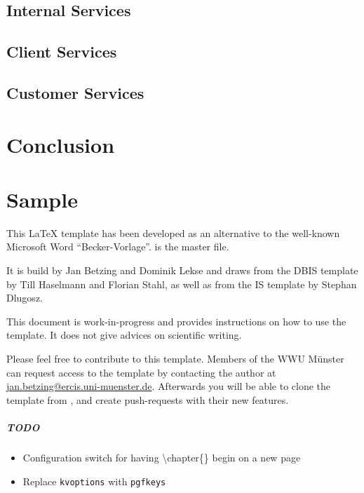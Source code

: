 	\section{Internal Services}
	\section{Client Services}
	\section{Customer Services}
\chapter{Conclusion}






\chapter{Sample}
This \LaTeX \- template has been developed as an alternative to the well-known Microsoft Word \enquote{Becker-Vorlage}.  is the master file.

It is build by  Jan Betzing and Dominik Lekse and draws from the DBIS template by Till Haselmann and Florian Stahl, as well as from the IS template by Stephan Dlugosz.

This document is work-in-progress and provides instructions on how to use the template. It does not give advices on scientific writing.

Please feel free to contribute to this template. Members of the WWU M\"{u}nster can request access to the template by contacting the author at \href{mailto:jan.betzing@ercis.uni-muenster.de}{jan.betzing@ercis.uni-muenster.de}. Afterwards you will be able to clone the template from , and create push-requests with their new features.

\paragraph{TODO}
\begin{itemize}
	\item Configuration switch for having \textbackslash chapter\{\} begin on a new page
	\item Replace \texttt{kvoptions} with \texttt{pgfkeys}
\end{itemize}
